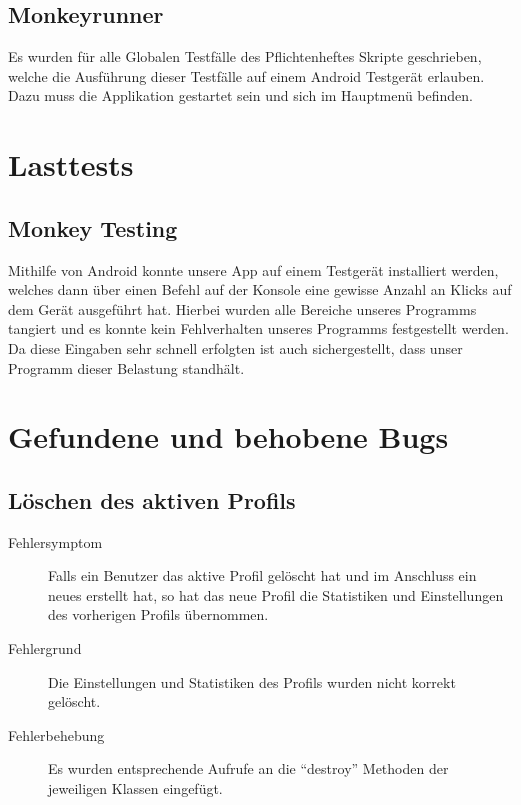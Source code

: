 \documentclass[parskip=full]{scrreprt}
\begin{document}
\section{Monkeyrunner}

Es wurden für alle Globalen Testfälle des Pflichtenheftes Skripte geschrieben, welche die Ausführung dieser Testfälle auf einem Android Testgerät erlauben. Dazu muss die Applikation gestartet sein und sich im Hauptmenü befinden.

\chapter{Lasttests}

\section{Monkey Testing}

Mithilfe von Android konnte unsere App auf einem Testgerät installiert werden, welches dann über einen Befehl auf der Konsole eine gewisse Anzahl an Klicks auf dem Gerät ausgeführt hat. Hierbei wurden alle Bereiche unseres Programms tangiert und es konnte kein Fehlverhalten unseres Programms festgestellt werden. Da diese Eingaben sehr schnell erfolgten ist auch sichergestellt, dass unser Programm dieser Belastung standhält.

\chapter{Gefundene und behobene Bugs}

\section{Löschen des aktiven Profils}
\begin{description}
	\item[Fehlersymptom] Falls ein Benutzer das aktive Profil gelöscht hat und im Anschluss ein neues erstellt hat, so hat das neue Profil die Statistiken und Einstellungen des vorherigen Profils übernommen.
	\item[Fehlergrund] Die Einstellungen und Statistiken des Profils wurden nicht korrekt gelöscht.
	\item[Fehlerbehebung] Es wurden entsprechende Aufrufe an die \enquote{destroy} Methoden der jeweiligen Klassen eingefügt.
\end{description}
\end{document}
